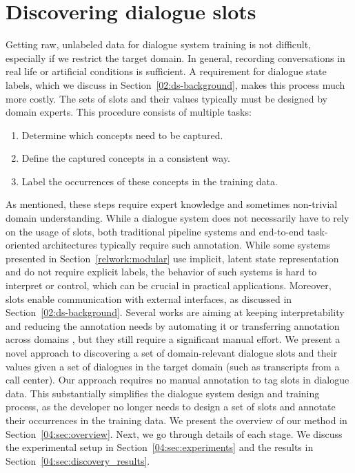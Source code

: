 \chapter{Discovering dialogue slots}%
\label{chap:data_analysis}
Getting raw, unlabeled data for dialogue system training is not difficult, especially if we restrict the target domain.
In general, recording conversations in real life or artificial conditions is sufficient.
A requirement for dialogue state labels, which we discuss in Section~\ref{02:ds-background}, makes this process much more costly.
The sets of slots and their values typically must be designed by domain experts.
This procedure consists of multiple tasks:
\begin{enumerate}
    \item Determine which concepts need to be captured.
    \item Define the captured concepts in a consistent way.
    \item Label the occurrences of these concepts in the training data.
\end{enumerate}
As mentioned, these steps require expert knowledge and sometimes non-trivial domain understanding.
While a dialogue system does not necessarily have to rely on the usage of slots, both traditional pipeline systems \cite{young_pomdp-based_2013} and end-to-end task-oriented architectures \cite{wen2016network} typically require such annotation.
While some systems presented in Section~\ref{relwork:modular} use implicit, latent state representation and do not require explicit labels, the behavior of such systems is hard to interpret or control, which can be crucial in practical applications.
Moreover, slots enable communication with external interfaces, as discussed in Section~\ref{02:ds-background}.
Several works are aiming at keeping interpretability and reducing the annotation needs by automating it \citep{chen2014leveraging,chen2015jointly} or transferring annotation across domains \cite{zhao_zero-shot_2018,coope_span-convert_2020}, but they still require a significant manual effort.
We present a novel approach to discovering a set of domain-relevant dialogue slots and their values given a set of dialogues in the target domain (such as transcripts from a call center).
Our approach requires no manual annotation to tag slots in dialogue data.
This substantially simplifies the dialogue system design and training process, as the developer no longer needs to design a set of slots and annotate their occurrences in the training data.
We present the overview of our method in Section~\ref{04:sec:overview}.
Next, we go through details of each stage.
We discuss the experimental setup in Section~\ref{04:sec:experiments} and the results in Section~\ref{04:sec:discovery_results}.

